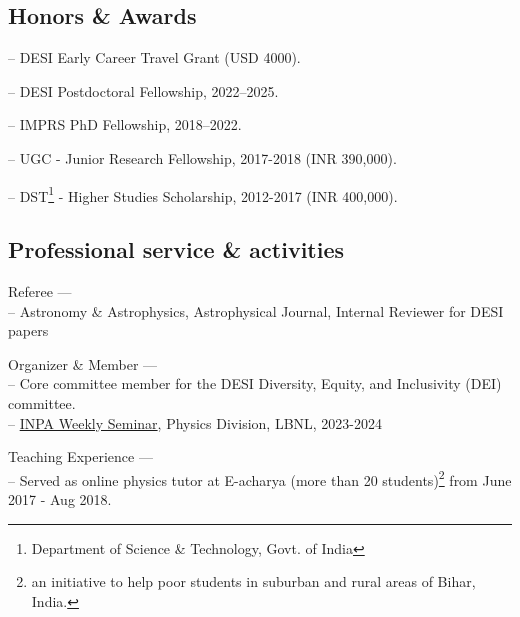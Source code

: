 \documentclass[12pt,letterpaper]{article}
\begin{document}
\subsection{Honors \& Awards}
\begin{list}{}{\cvlist}
  \item -- DESI Early Career Travel Grant (USD 4000).
  \item -- DESI Postdoctoral Fellowship, 2022--2025.
  \item -- IMPRS PhD Fellowship, 2018--2022.
  \item -- UGC - Junior Research Fellowship, 2017-2018 (INR 390,000).
  \item -- DST\footnote{Department of Science \& Technology, Govt. of India} -  Higher Studies Scholarship, 2012-2017 (INR 400,000).
\end{list}


\subsection{Professional service \& activities}
\begin{list}{}{\cvlist}
    \item Referee --- \\
    -- Astronomy \& Astrophysics, Astrophysical Journal, Internal Reviewer for DESI papers
    \item Organizer \& Member --- \\
        -- Core committee member for the DESI Diversity, Equity, and Inclusivity (DEI) committee. \\
        -- \href{https://inpa.lbl.gov/events/}{INPA Weekly Seminar}, Physics Division, LBNL, 2023-2024 \\
       \item Teaching Experience --- \\
        -- Served as online physics tutor at E-acharya (more than 20 students)\footnote{an initiative to help poor students in suburban and rural areas of Bihar, India.} from June 2017 - Aug 2018. \\
        \end{list}
\end{document}
